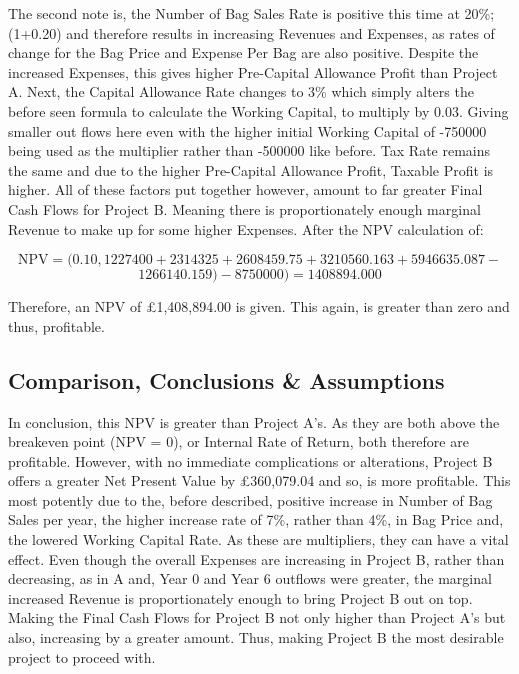 \documentclass[11pt, english]{article}
\begin{document}
	The second note is, the Number of Bag Sales Rate is positive this time at 20\%; (1+0.20) and therefore results in increasing Revenues and Expenses, as rates of change for the Bag Price and Expense Per Bag are also positive. Despite the increased Expenses, this gives higher Pre-Capital Allowance Profit than Project A. Next, the Capital Allowance Rate changes to 3\% which simply alters the before seen formula to calculate the Working Capital, to multiply by 0.03. Giving smaller out flows here even with the higher initial Working Capital of -750000 being used as the multiplier rather than -500000 like before. Tax Rate remains the same and due to the higher Pre-Capital Allowance Profit, Taxable Profit is higher. All of these factors put together however, amount to far greater Final Cash Flows for Project B. Meaning there is proportionately enough marginal Revenue to make up for some higher Expenses. After the NPV calculation of: 

	$$\mathrm{NPV=(0.10,1227400+2314325+2608459.75+3210560.163+5946635.087-}$$ $$\mathrm{1266140.159)-8750000)=1408894.000}$$

	Therefore, an NPV of \pounds1,408,894.00 is given. This again, is greater than zero and thus, profitable.

	\subsection{Comparison, Conclusions \& Assumptions}

	In conclusion, this NPV is greater than Project A's. As they are both above the breakeven point (NPV = 0), or Internal Rate of Return, both therefore are profitable. However, with no immediate complications or alterations, Project B offers a greater Net Present Value by \pounds360,079.04 and so, is more profitable. This most potently due to the, before described, positive increase in Number of Bag Sales per year, the higher increase rate of 7\%, rather than 4\%, in Bag Price and, the lowered Working Capital Rate. As these are multipliers, they can have a vital effect. Even though the overall Expenses are increasing in Project B, rather than decreasing, as in A and, Year 0 and Year 6 outflows were greater, the marginal increased Revenue is proportionately enough to bring Project B out on top. Making the Final Cash Flows for Project B not only higher than Project A's but also, increasing by a greater amount. Thus, making Project B the most desirable project to proceed with.\\
\end{document}
